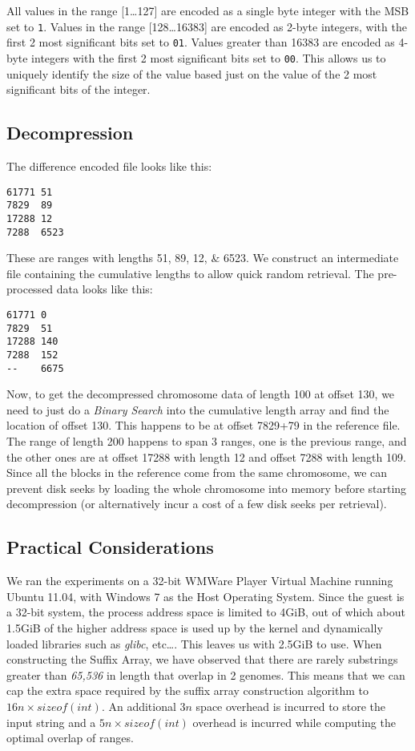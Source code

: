 \documentclass[11pt]{article}
\begin{document}
All values in the range [1\ldots{}127] are encoded as a single byte
integer with the MSB set to \texttt{1}. Values in the range
[128\ldots{}16383] are encoded as 2-byte integers, with the first 2
most significant bits set to \texttt{01}. Values greater than 16383
are encoded as 4-byte integers with the first 2 most significant bits
set to \texttt{00}. This allows us to uniquely identify the size of
the value based just on the value of the 2 most significant bits of
the integer.

\subsection{Decompression}

The difference encoded file looks like this:
\begin{verbatim}
61771 51
7829  89
17288 12
7288  6523
\end{verbatim}

These are ranges with lengths 51, 89, 12, \& 6523. We construct an
intermediate file containing the cumulative lengths to allow quick
random retrieval. The pre-processed data looks like this:

\begin{verbatim}
61771 0
7829  51
17288 140
7288  152
--    6675
\end{verbatim}

Now, to get the decompressed chromosome data of length 100 at offset
130, we need to just do a \textit{Binary Search} into the cumulative
length array and find the location of offset 130. This happens to be
at offset 7829+79 in the reference file. The range of length 200
happens to span 3 ranges, one is the previous range, and the other
ones are at offset 17288 with length 12 and offset 7288 with length
109. Since all the blocks in the reference come from the same
chromosome, we can prevent disk seeks by loading the whole chromosome
into memory before starting decompression (or alternatively incur a
cost of a few disk seeks per retrieval).


\subsection{Practical Considerations}

We ran the experiments on a 32-bit WMWare Player Virtual Machine
running Ubuntu 11.04, with Windows 7 as the Host Operating
System. Since the guest is a 32-bit system, the process address space
is limited to 4GiB, out of which about 1.5GiB of the higher address
space is used up by the kernel and dynamically loaded libraries such
as \textit{glibc}, etc\ldots{}. This leaves us with 2.5GiB to
use. When constructing the Suffix Array, we have observed that there
are rarely substrings greater than \textit{65,536} in length that
overlap in 2 genomes. This means that we can cap the extra space
required by the suffix array construction algorithm to $16n \times
sizeof(int)$. An additional $3n$ space overhead is incurred to store
the input string and a $5n \times sizeof(int)$ overhead is incurred
while computing the optimal overlap of ranges.
\end{document}
